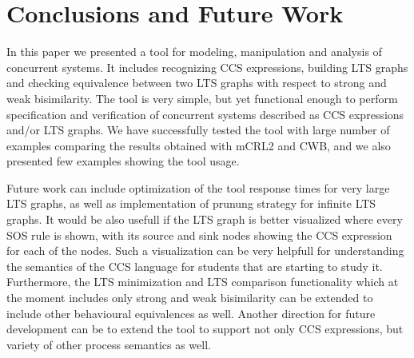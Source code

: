 \section{Conclusions and Future Work}
In this paper we presented a tool for modeling, manipulation and analysis of concurrent systems. It includes recognizing CCS expressions, building LTS graphs and checking equivalence between two LTS graphs with respect to strong and weak bisimilarity. The tool is very simple, but yet functional enough to perform specification and verification of concurrent systems described as CCS expressions and/or LTS graphs. We have successfully tested the tool with large number of examples comparing the results obtained with mCRL2 and CWB, and we also presented few examples showing the tool usage. 

Future work can include optimization of the tool response times for very large LTS graphs, as well as implementation of prunung strategy for infinite LTS graphs. It would be also usefull if the LTS graph is better visualized where every SOS rule is shown, with its source and sink nodes showing the CCS expression for each of the nodes. Such a visualization can be very helpfull for understanding the semantics of the CCS language for students that are starting to study it. Furthermore, the LTS minimization and LTS comparison functionality which at the moment includes only strong and weak bisimilarity can be extended to include other behavioural equivalences as well. Another direction for future development can be to extend the tool to support not only CCS expressions, but variety of other process semantics as well. 
